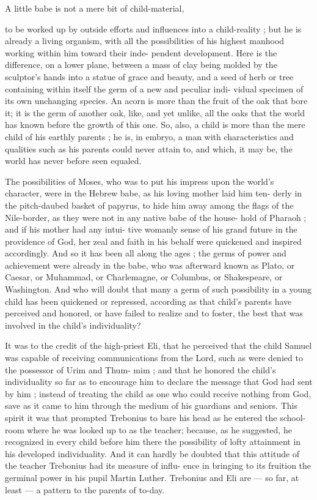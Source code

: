 \documentclass[
]{book}
\begin{document}
A little babe is not a mere bit of child-material,

to be worked up by outside efforts and influences into a child-reality ; but he is already a living organism, with all the possibilities of his highest manhood working within him toward their inde- pendent development. Here is the difference, on a lower plane, between a mass of clay being molded by the sculptor's hands into a statue of grace and beauty, and a seed of herb or tree containing within itself the germ of a new and peculiar indi- vidual specimen of its own unchanging species. An acorn is more than the fruit of the oak that bore it; it is the germ of another oak, like, and yet unlike, all the oaks that the world has known before the growth of this one. So, also, a child is more than the mere child of his earthly parents ; he is, in embryo, a man with characteristics and qualities such as his parents could never attain to, and which, it may be, the world has never before seen equaled.

The possibilities of Moses, who was to put his impress upon the world's character, were in the Hebrew babe, as his loving mother laid him ten- derly in the pitch-daubed basket of papyrus, to hide him away among the flags of the Nile-border, as they were not in any native babe of the house- hold of Pharaoh ; and if his mother had any intui- tive womanly sense of his grand future in the providence of God, her zeal and faith in his behalf were quickened and inspired accordingly. And so it has been all along the ages ; the germs of power and achievement were already in the babe, who was afterward known as Plato, or Caesar, or Muhammad, or Charlemagne, or Columbus, or Shakespeare, or Washington. And who will doubt that many a germ of such possibility in a young child has been quickened or repressed, according as that child's parents have perceived and honored, or have failed to realize and to foster, the best that was involved in the child's individuality?

It was to the credit of the high-priest Eli, that he perceived that the child Samuel was capable of receiving communications from the Lord, such as were denied to the possessor of Urim and Thum- mim ; and that he honored the child's individuality so far as to encourage him to declare the message that God had sent by him ; instead of treating the child as one who could receive nothing from God, save as it came to him through the medium of his guardians and seniors. This spirit it was that prompted Trebonius to bare his head as he entered the school-room where he was looked up to as the teacher; because, as he suggested, he recognized in every child before him there the possibility of lofty attainment in his developed individuality. And it can hardly be doubted that this attitude of the teacher Trebonius had its measure of influ- ence in bringing to its fruition the germinal power in his pupil Martin Luther. Trebonius and Eli are --- so far, at least --- a pattern to the parents of to-day.
\end{document}
